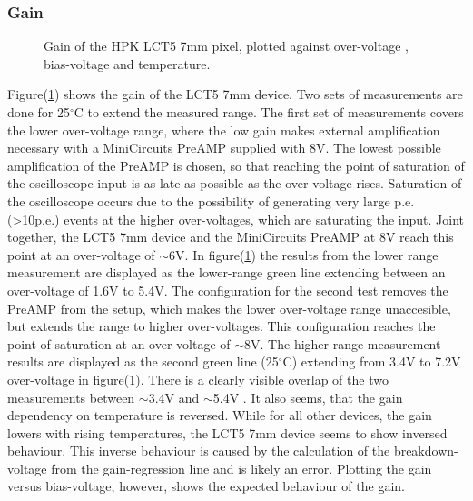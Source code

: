 \documentclass[12pt,article,type=msc,colorback,accentcolor=tud9c]{tudthesis}
\begin{document}
\clearpage
\subsubsection{Gain}
\label{subsubsec:LCT57Gain}
\begin{figure}[h]
\begin{centering}
\caption[LCT5 7mm gain]{Gain of the HPK LCT5 7mm pixel, plotted against over-voltage , bias-voltage and temperature.}
\label{fig:LCT57_Gain}
\end{centering}
\end{figure}

Figure(\ref{fig:LCT57_Gain}) shows the gain of the LCT5 7mm device. Two sets of measurements are done for 25$^\circ$C to extend the measured range. The first set of measurements covers the lower over-voltage range, where the low gain makes external amplification necessary with a MiniCircuits PreAMP supplied with 8V. The lowest possible amplification of the PreAMP is chosen, so that reaching the point of saturation of the oscilloscope input is as late as possible as the over-voltage rises. Saturation of the oscilloscope occurs due to the possibility of generating very large p.e. (>10p.e.) events at the higher over-voltages, which are saturating the input. Joint together, the LCT5 7mm device and the MiniCircuits PreAMP at 8V reach this point at an over-voltage of $\sim$6V. In figure(\ref{fig:LCT57_Gain}) the results from the lower range measurement are displayed as the lower-range green line extending between an over-voltage of 1.6V to 5.4V.
The configuration for the second test removes the PreAMP from the setup, which makes the lower over-voltage range unaccesible, but extends the range to higher over-voltages. This configuration reaches the point of saturation at an over-voltage of $\sim$8V. The higher range measurement results are displayed as the second green line (25$^\circ$C) extending from 3.4V to 7.2V over-voltage in figure(\ref{fig:LCT57_Gain}). There is a clearly visible overlap of the two measurements between $\sim$3.4V and $\sim$5.4V . It also seems, that the gain dependency on temperature is reversed. While for all other devices, the gain lowers with rising temperatures, the LCT5 7mm device seems to show inversed behaviour. This inverse behaviour is caused by the calculation of the breakdown-voltage from the gain-regression line and is likely an error. Plotting the gain versus bias-voltage, however, shows the expected behaviour of the gain.
\end{document}
